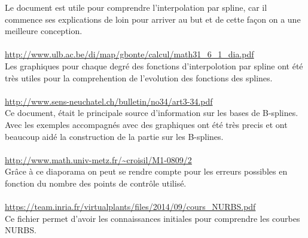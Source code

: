 \documentclass{article}
\begin{document}
Le document est utile pour comprendre l'interpolation par spline, car il commence ses explications
de loin pour arriver au but et de cette fa\c con on a une meilleure conception.
\\\\
{\color{blue}
\url{http://www.ulb.ac.be/di/map/gbonte/calcul/math31_6_1_dia.pdf}}\\
Les graphiques pour chaque degr\'e des fonctions d'interpolotion par spline ont \'et\'e tr\`es utiles pour la comprehention de l'evolution des fonctions des splines.
\\\\
{\color{blue}
\url{http://www.sens-neuchatel.ch/bulletin/no34/art3-34.pdf}}\\
Ce document, \'etait le principale source d'information sur les bases de B-splines. Avec les exemples accompagn\'es avec des graphiques ont \'et\'e tr\`es precis et ont beaucoup aid\'e la construction de la partie sur les B-splines.
\\\\ 
{\color{blue}
\url{http://www.math.univ-metz.fr/~croisil/M1-0809/2}}\\
Gr\^ace \`a ce diaporama on peut se rendre compte pour les erreurs possibles en fonction du nombre des points de contr\^ole utilis\'e.
\\\\ 
{\color{blue}
\url{https://team.inria.fr/virtualplants/files/2014/09/cours_NURBS.pdf}}\\
Ce fichier permet d'avoir les connaissances initiales pour comprendre les courbes NURBS.
\\\\ 
\end{document}
